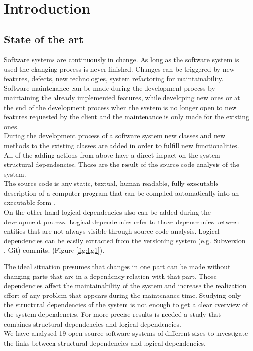 \chapter{Introduction}

\section {State of the art}
\tab Software systems are continuously in change. As long as the software system is used the changing process is never ﬁnished. Changes can be triggered by new features, defects, new technologies, system refactoring for maintainability.\\ Software maintenance can be made during the development process by maintaining the already implemented features, while developing new ones or at the end of the development process when the system is no longer open to new features requested by the client and the maintenance is only made for the existing ones.\\

\tab During the development process of a software system new classes and new methods to the existing classes are added in order to fulﬁll new functionalities. All of the adding actions from above have a direct impact on the system structural dependencies. Those are the result of the source code analysis of the system. \\The source code is any static, textual, human readable, fully executable description of a computer program that can be compiled automatically into an executable form \cite{ct1}.\\On the other hand logical dependencies also can be added during the development process. Logical dependencies refer to those depencencies between entities that are not always visible through source code analysis. Logical dependencies can be easily extracted from the versioning system (e.g. Subversion , Git) commits.  (Figure \ref{fig:fig1}).

\tab The ideal situation presumes that changes in one part can be made without changing parts that are in a dependency relation with that part. Those dependencies aﬀect the maintainability of the system and increase the realization eﬀort of any problem that appears during the maintenance time. Studying only the structural dependencies of the system is not enough to get a clear overview of the system dependencies. For more precise results is needed a study that combines structural dependencies and logical dependencies. \\ We have analysed 19 open-source software systems of diﬀerent sizes to investigate the links between structural dependencies and logical dependencies. 


